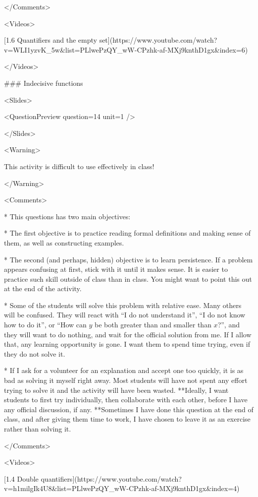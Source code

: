 </Comments>

<Videos>

[1.6 Quantifiers and the empty set](https://www.youtube.com/watch?v=WLI1yzvK_5w\&list=PLlwePzQY_wW-CPzhk-af-MXj9knthD1gx\&index=6)

</Videos>

### Indecisive functions

<Slides>

<QuestionPreview question={14} unit={1} />

</Slides>

<Warning>

This activity is difficult to use effectively in class!

</Warning>

<Comments>

*   This questions has two main objectives:

    *   The first objective is to practice reading formal definitions and making sense of them, as well as constructing examples.

    *   The second (and perhaps, hidden) objective is to learn persistence. If a problem appears confusing at first, stick with it until it makes sense. It is easier to practice such skill outside of class than in class. You might want to point this out at the end of the activity.

*   Some of the students will solve this problem with relative ease. Many others will be confused. They will react with “I do not understand it”, “I do not know how to do it”, or “How can $y$ be both greater than and smaller than $x$?”, and they will want to do nothing, and wait for the official solution from me. If I allow that, any learning opportunity is gone. I want them to spend time trying, even if they do not solve it.

*   If I ask for a volunteer for an explanation and accept one too quickly, it is as bad as solving it myself right away. Most students will have not spent any effort trying to solve it and the activity will have been wasted. **Ideally, I want students to first try individually, then collaborate with each other, before I have any official discussion, if any. **Sometimes I have done this question at the end of class, and after giving them time to work, I have chosen to leave it as an exercise rather than solving it.

</Comments>

<Videos>

[1.4 Double quantifiers](https://www.youtube.com/watch?v=h1milgIk4U8\&list=PLlwePzQY_wW-CPzhk-af-MXj9knthD1gx\&index=4)

